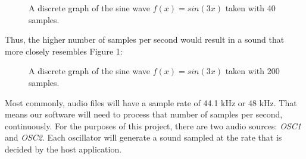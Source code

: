 \documentclass[12pt]{article}
\begin{document}
\begin{figure}[h] %
	\begin{center}
		\caption{A discrete graph of the sine wave \(f(x) = sin(3x)\) taken with 40 samples.}
	\end{center}
\end{figure}

Thus, the higher number of samples per second would result in a sound that more closely resembles Figure 1:

\begin{figure}[h] %
	\begin{center}
		\caption{A discrete graph of the sine wave \(f(x) = sin(3x)\) taken with 200 samples.}
	\end{center}
\end{figure}


Most commonly, audio files will have a sample rate of 44.1 kHz or 48 kHz. That means our software will need to process that number of samples per second, continuously. For the purposes of this project, there are two audio sources: \textit{OSC1} and \textit{OSC2}. Each oscillator will generate a sound sampled at the rate that is decided by the host application.
\end{document}
